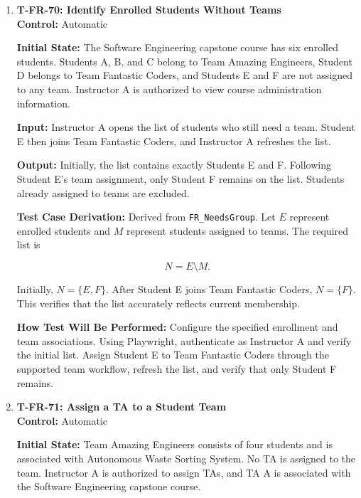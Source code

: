 \documentclass[12pt, titlepage]{article}
\begin{document}
\begin{enumerate}
\textbf{How Test Will Be Performed:} Configure the course without Avenue integration. Using Playwright, authenticate as Instructor A and manually add Student D. Verify that the student appears in the course enrollment with the correct identifier and association.

\item \label{T-FR-70}\textbf{T-FR-70: Identify Enrolled Students Without Teams}\\

\textbf{Control:} Automatic

\textbf{Initial State:} The Software Engineering capstone course has six enrolled students. Students A, B, and C belong to Team Amazing Engineers, Student D belongs to Team Fantastic Coders, and Students E and F are not assigned to any team. Instructor A is authorized to view course administration information.

\textbf{Input:} Instructor A opens the list of students who still need a team. Student E then joins Team Fantastic Coders, and Instructor A refreshes the list.

\textbf{Output:} Initially, the list contains exactly Students E and F. Following Student E's team assignment, only Student F remains on the list. Students already assigned to teams are excluded.

\textbf{Test Case Derivation:} Derived from \texttt{FR\_NeedsGroup}. Let $E$ represent enrolled students and $M$ represent students assigned to teams. The required list is

\[
N=E\setminus M.
\]

Initially, $N=\{E,F\}$. After Student E joins Team Fantastic Coders, $N=\{F\}$. This verifies that the list accurately reflects current membership.

\textbf{How Test Will Be Performed:} Configure the specified enrollment and team associations. Using Playwright, authenticate as Instructor A and verify the initial list. Assign Student E to Team Fantastic Coders through the supported team workflow, refresh the list, and verify that only Student F remains.


\item \label{T-FR-71}\textbf{T-FR-71: Assign a TA to a Student Team}\\

\textbf{Control:} Automatic

\textbf{Initial State:} Team Amazing Engineers consists of four students and is associated with Autonomous Waste Sorting System. No TA is assigned to the team. Instructor A is authorized to assign TAs, and TA A is associated with the Software Engineering capstone course.


\end{enumerate}
\end{document}
